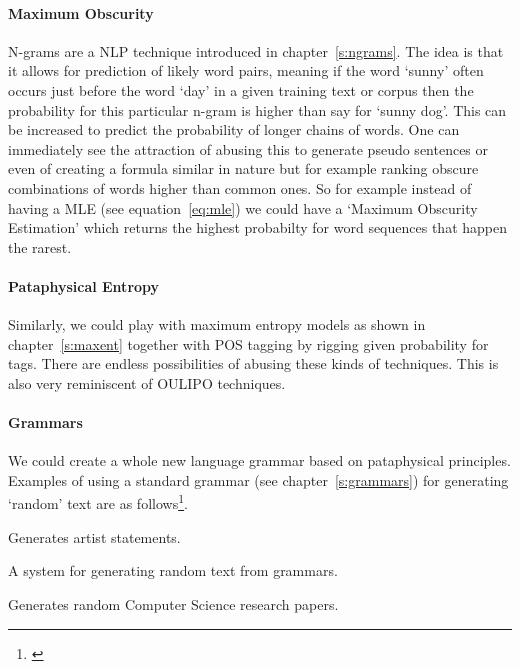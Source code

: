 \paragraph{Maximum Obscurity}
N-grams are a \ac{NLP} technique introduced in chapter~\ref{s:ngrams}. The idea is that it allows for prediction of likely word pairs, meaning if the word `sunny' often occurs just before the word `day' in a given training text or corpus then the probability for this particular n-gram is higher than say for `sunny dog'. This can be increased to predict the probability of longer chains of words. One can immediately see the attraction of abusing this to generate pseudo sentences or even of creating a formula similar in nature but for example ranking obscure combinations of words higher than common ones. So for example instead of having a \acf{MLE} (see equation~\ref{eq:mle}\marginpar{$\bm{\Sigma}$~\ref{eq:mle}}) we could have a `Maximum Obscurity Estimation' which returns the highest probabilty for word sequences that happen the rarest.

\paragraph{Pataphysical Entropy}
Similarly, we could play with maximum entropy models as shown in chapter~\ref{s:maxent} together with \ac{POS} tagging by rigging given probability for tags. There are endless possibilities of abusing these kinds of techniques. This is also very reminiscent of \ac{OULIPO} techniques. 

\paragraph{Grammars}
We could create a whole new language grammar based on pataphysical principles. Examples of using a standard grammar (see chapter~\ref{s:grammars}) for generating `random' text are as follows\footnote{\autocite{Winter2016,Dada2016,Stribling2016}}.

\begin{adjustwidth}{1cm}{}
\begin{description}[leftmargin=3cm]
  \item[ArtyBollocks] Generates artist statements.
  \item[DadaEngine] A system for generating random text from grammars.
  \item[SciGen] Generates random Computer Science research papers.
\end{description}
\end{adjustwidth}

